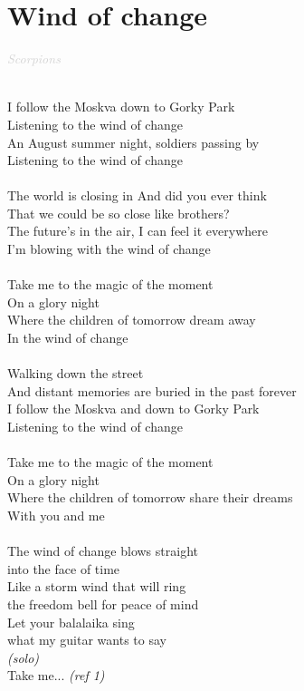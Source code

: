 \documentclass[a5paper, 10pt]{book}
\begin{document}
\newpage
\section{Wind of change}\textcolor{lightgray}{\textit{Scorpions}}\\~\\
\begin{minipage}[t]{0.8\textwidth}
  I follow the Moskva down to Gorky Park\\
  Listening to the wind of change\\
  An August summer night, soldiers passing by\\
  Listening to the wind of change\\
  \\
  The world is closing in And did you ever think\\
  That we could be so close like brothers?\\
  The future's in the air, I can feel it everywhere\\
  I'm blowing with the wind of change\\
  \\
  \hspace*{3mm}Take me to the magic of the moment\\
  \hspace*{3mm}On a glory night\\
  \hspace*{3mm}Where the children of tomorrow dream away\\
  \hspace*{3mm}In the wind of change\\
  \\
  Walking down the street\\
  And distant memories are buried in the past forever\\
  I follow the Moskva and down to Gorky Park\\
  Listening to the wind of change\\
  \\
  \hspace*{3mm}Take me to the magic of the moment\\
  \hspace*{3mm}On a glory night\\
  \hspace*{3mm}Where the children of tomorrow share their dreams\\
  \hspace*{3mm}With you and me\\
  \\
  The wind of change blows straight\\
  into the face of time\\
  Like a storm wind that will ring\\
  the freedom bell for peace of mind\\
  Let your balalaika sing\\
  what my guitar wants to say\\
  \hspace*{19mm}\textit{\small (solo)}\\
  \hspace*{3mm}Take me... \textit{\small (ref 1)}\\


\end{minipage}
\end{document}

